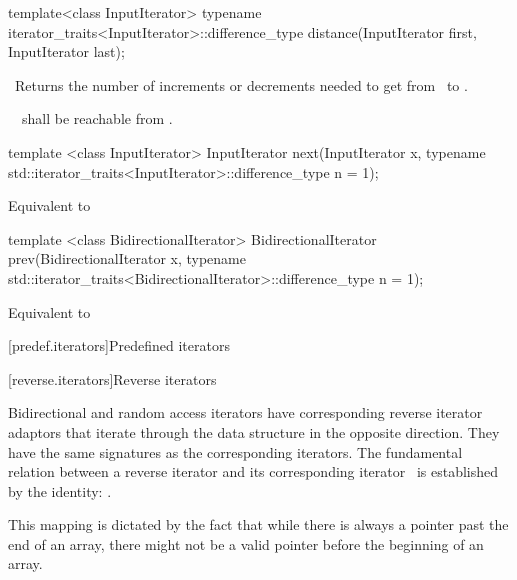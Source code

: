 \documentclass[american,twoside]{book}
\begin{document}
\begin{paras}
%
\begin{itemdecl}
  template<class InputIterator>
      typename iterator_traits<InputIterator>::difference_type
         distance(InputIterator first, InputIterator last);
\end{itemdecl}

\begin{itemdescr}
\pnum
\effects\ 
Returns the number of increments or decrements needed to get from
\tcode{first}\
to
.

\pnum
\requires\ 
\
shall be reachable from
.
\end{itemdescr}

%
\begin{itemdecl}
template <class InputIterator>
  InputIterator next(InputIterator x,
    typename std::iterator_traits<InputIterator>::difference_type n = 1);
\end{itemdecl}

\begin{itemdescr}
\pnum
\effects Equivalent to 
\end{itemdescr}

%
\begin{itemdecl}
template <class BidirectionalIterator>
  BidirectionalIterator prev(BidirectionalIterator x,
    typename std::iterator_traits<BidirectionalIterator>::difference_type n = 1);
\end{itemdecl}

\begin{itemdescr}
\pnum
\effects Equivalent to 
\end{itemdescr}

\rSec1[predef.iterators]{Predefined iterators}

\rSec2[reverse.iterators]{Reverse iterators}

\pnum
Bidirectional and random access iterators have corresponding reverse iterator adaptors that iterate through
the data structure in the opposite direction.
They have the same signatures as the corresponding iterators.
The fundamental relation between a reverse iterator and its corresponding iterator
\tcode{i}\
is established by the identity:
\tcode{\&*(reverse_iterator(i)) == \&*(i - 1)}.

\pnum
This mapping is dictated by the fact that while there is always a pointer past the end of an array, there might
not be a valid pointer before the beginning of an array.


\end{paras}
\end{document}
